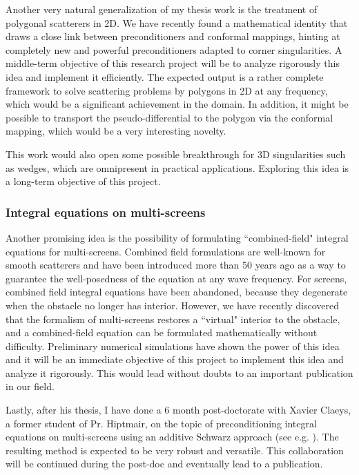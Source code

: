 \documentclass[]{article}
\begin{document}
Another very natural generalization of my thesis work is the treatment of polygonal scatterers in 2D. We have recently found a mathematical identity that draws a close link between preconditioners and conformal mappings, hinting at completely new and powerful preconditioners adapted to corner singularities. A middle-term objective of this research project will be to analyze rigorously this idea and implement it efficiently. The expected output is a rather complete framework to solve scattering problems by polygons in 2D at any frequency, which would be a significant achievement in the domain. In addition, it might be possible to transport the pseudo-differential to the polygon via the conformal mapping, which would be a very interesting novelty. 

This work would also open some possible breakthrough for 3D singularities such as wedges, which are omnipresent in practical applications. Exploring this idea is a long-term objective of this project.


\subsubsection*{Integral equations on multi-screens}

Another promising idea is the possibility of formulating ``combined-field" integral equations for multi-screens. Combined field formulations are well-known for smooth scatterers and have been introduced more than 50 years ago \cite{brakhage1965dirichletsehe} as a way to guarantee the well-posedness of the equation at any wave frequency. For screens, combined field integral equations have been abandoned, because they degenerate when the obstacle no longer has interior. 
However, we have recently discovered that the formalism of multi-screens restores a ``virtual" interior to the obstacle, and a combined-field equation can be formulated mathematically without difficulty. Preliminary numerical simulations have shown the power of this idea and it will be an immediate objective of this project to implement this idea and analyze it rigorously. This would lead without doubts to an important publication in our field. 

Lastly, after his thesis, I have done a 6 month post-doctorate with Xavier Claeys, a former student of Pr. Hiptmair, on the topic of preconditioning integral equations on multi-screens using an additive Schwarz approach (see e.g. \cite{marchand2019two}). The resulting method is expected to be very robust and versatile. This collaboration will be continued during the post-doc and eventually lead to a publication. 
\end{document}
